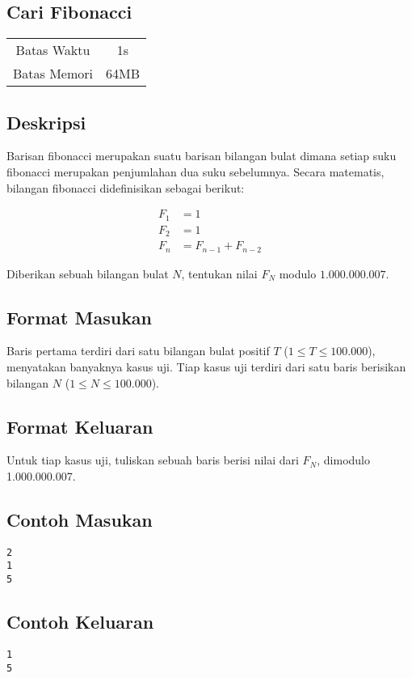 \documentclass{article}
\begin{document}
\begin{center}
    \section*{Cari Fibonacci}

    \begin{tabular}{ | c c | }
        \hline
        Batas Waktu  & 1s \\
        Batas Memori & 64MB \\
        \hline
    \end{tabular}
\end{center}

\subsection*{Deskripsi}

Barisan fibonacci merupakan suatu barisan bilangan bulat dimana setiap suku fibonacci merupakan penjumlahan dua suku sebelumnya. Secara matematis, bilangan fibonacci didefinisikan sebagai berikut:

\begin{align*}
F_1 & = 1 \\
F_2 & = 1 \\
F_n & = F_{n-1} + F_{n-2}
\end{align*}

Diberikan sebuah bilangan bulat $N$, tentukan nilai $F_N$ modulo $1.000.000.007$.

\subsection*{Format Masukan}

Baris pertama terdiri dari satu bilangan bulat positif $T$ ($1 \leq T \leq 100.000$), menyatakan banyaknya kasus uji.
Tiap kasus uji terdiri dari satu baris berisikan bilangan $N$ ($1 \leq N \leq 100.000$).

\subsection*{Format Keluaran}

Untuk tiap kasus uji, tuliskan sebuah baris berisi nilai dari $F_N$, dimodulo 1.000.000.007.
\\

\begin{multicols}{2}
\subsection*{Contoh Masukan}
\begin{lstlisting}
2
1
5
\end{lstlisting}
\columnbreak
\subsection*{Contoh Keluaran}
\begin{lstlisting}
1
5
\end{lstlisting}
\vfill
\null
\end{multicols}

\pagebreak
\end{document}
